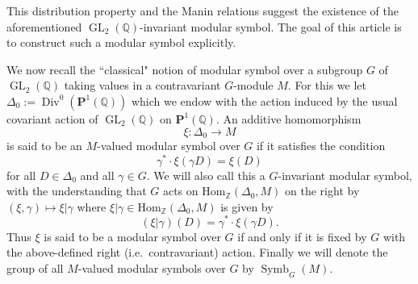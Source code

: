 \documentclass[12pt,amstex,amssymb]{article}
\theoremstyle{plain}
\theoremstyle{definition}
\def\lra{\longrightarrow}
\def\g{\gamma}
\def\Z{{\mathbb Z}}
\def\C{{\mathbb C}}
\def\Q{{\mathbb Q}}
\def\Hom{\text{Hom}}
\def\Sym{\text{Sym}}
\def\BP{{\mathbf{P}}}
\def\g{\gamma}
\newcommand{\be}{\begin{eqnarray*}}
\newcommand{\ee}{\end{eqnarray*}}
\newcommand{\GL}{\operatorname{GL}}
\newcommand{\SL}{\operatorname{SL}}
\begin{document}
This distribution property and the Manin relations suggest the  existence of the aforementioned $\GL_2(\Q)$-invariant modular symbol. The goal of this article is to construct such a modular symbol explicitly.


We now recall the ``classical" notion of modular symbol over a subgroup $G$ of $\GL_2(\Q)$ taking values in a contravariant $G$-module $M$.   
For this we let $\Delta_0 :=\operatorname{Div}^0(\BP^1(\Q))$ which we endow with the action induced by the usual covariant action of $\GL_2(\Q)$ on  
$\BP^1(\Q)$.   An additive homomorphism 
$$
\xi : \Delta_0 \lra M
$$ 
 is said to be an $M$-valued modular symbol over $G$ if it satisfies the condition 
 $$
 \gamma^\ast \cdot \xi(\gamma D) = \xi(D)
 $$ 
 for all $D\in \Delta_0$ and all $\gamma\in G$.  We will also call this a $G$-invariant modular symbol, with the understanding that $G$ acts on $\Hom_\Z(\Delta_0, M)$ on the right by $(\xi,\gamma) \longmapsto \xi | \gamma$ where $\xi|\gamma \in \Hom_\Z(\Delta_0, M)$ is given by
$$
(\xi | \gamma)(D) = \gamma^\ast \cdot \xi ( \gamma D).
$$
Thus $\xi$ is said to be a modular symbol over $G$ if and only if it is fixed by $G$ with the above-defined right (i.e.\ contravariant) action.
Finally we will denote the group of all $M$-valued modular symbols over $G$ by $\operatorname{Symb}_G(M)$.


\noindent
\end{document}
